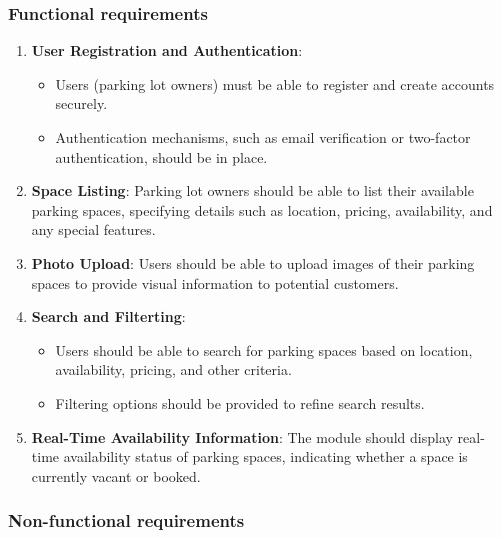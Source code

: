 \subsubsection{Functional requirements}

\begin{enumerate}
    \item \textbf{User Registration and Authentication}:
    \begin{itemize}
        \item Users (parking lot owners) must be able to register and create accounts securely.
        \item Authentication mechanisms, such as email verification or two-factor authentication, should be in place.
    \end{itemize}
    \item \textbf{Space Listing}: Parking lot owners should be able to list their available parking spaces, specifying details such as location, pricing, availability, and any special features.
    \item \textbf{Photo Upload}: Users should be able to upload images of their parking spaces to provide visual information to potential customers.
    \item \textbf{Search and Filterting}:
    \begin{itemize}
        \item Users should be able to search for parking spaces based on location, availability,
        pricing, and other criteria.
        \item Filtering options should be provided to refine search results.
    \end{itemize}
    \item \textbf{Real-Time Availability Information}: The module should display real-time availability status of parking spaces, indicating whether a space is currently vacant or booked.
\end{enumerate}

\subsubsection{Non-functional requirements}

